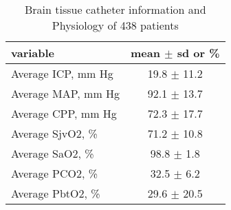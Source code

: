 \documentclass{article}
\begin{document}
\newpage
\begin{table}[H]
\caption{Brain tissue catheter information and Physiology of 438 patients}
\begin{center}
\begin{tabular}{lc}
\hline
variable & mean $\pm$ sd or \%\\
\hline
Average ICP, mm Hg & 19.8 $\pm$ 11.2 \\
Average MAP, mm Hg & 92.1 $\pm$ 13.7 \\
Average CPP, mm Hg & 72.3 $\pm$ 17.7 \\
Average SjvO2, \% & 71.2 $\pm$ 10.8 \\
Average SaO2, \% & 98.8 $\pm$ 1.8\\
Average PCO2, \% & 32.5 $\pm$ 6.2\\
Average PbtO2, \% & 29.6 $\pm$ 20.5\\
\hline
\end{tabular}
\end{center}
\label{demog}
\end{table}%
\end{document}
